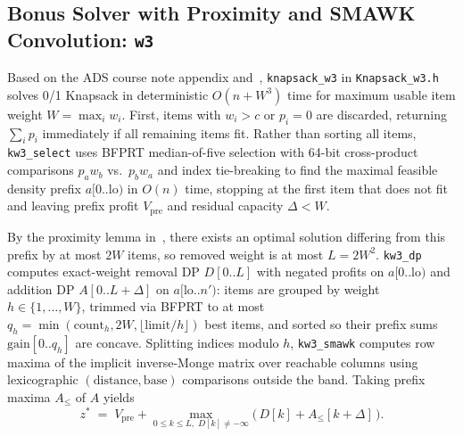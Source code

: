 \documentclass[10pt, a4paper]{article}
\newcommand{\code}[1]{\texttt{\color{primary!90!black}#1}}
\newcommand{\id}[1]{\ensuremath{\mathrm{#1}}}
\begin{document}
\subsection{Bonus Solver with Proximity and SMAWK Convolution: \texttt{w3}}
Based on the ADS course note appendix and~\cite{polak2021knapsack}, \code{knapsack\_w3} in \code{Knapsack\_w3.h} solves 0/1 Knapsack in deterministic $O(n + W^3)$ time for maximum usable item weight $W = \max_i w_i$. First, items with $w_i > c$ or $p_i = 0$ are discarded, returning $\sum_i p_i$ immediately if all remaining items fit. Rather than sorting all items, \code{kw3\_select} uses BFPRT median-of-five selection with 64-bit cross-product comparisons $p_a w_b$ vs.\ $p_b w_a$ and index tie-breaking to find the maximal feasible density prefix $a[0..\id{lo})$ in $O(n)$ time, stopping at the first item that does not fit and leaving prefix profit $V_{\text{pre}}$ and residual capacity $\Delta < W$.

By the proximity lemma in~\cite{polak2021knapsack}, there exists an optimal solution differing from this prefix by at most $2W$ items, so removed weight is at most $L = 2W^2$. \code{kw3\_dp} computes exact-weight removal DP $D[0..L]$ with negated profits on $a[0..\id{lo})$ and addition DP $A[0..L+\Delta]$ on $a[\id{lo}..n')$: items are grouped by weight $h \in \{1, \ldots, W\}$, trimmed via BFPRT to at most $q_h = \min(\id{count}_h, 2W, \lfloor \id{limit}/h \rfloor)$ best items, and sorted so their prefix sums $\id{gain}[0..q_h]$ are concave. Splitting indices modulo $h$, \code{kw3\_smawk} computes row maxima of the implicit inverse-Monge matrix over reachable columns using lexicographic $(\id{distance}, \id{base})$ comparisons outside the band. Taking prefix maxima $A_{\le}$ of $A$ yields
\begin{equation}
  z^* \;=\; V_{\text{pre}} + \max_{0 \le k \le L,\; D[k] \neq -\infty} \bigl(\, D[k] + A_{\le}[k + \Delta] \,\bigr).
  \label{eq:w3_recombine}
\end{equation}
\end{document}
